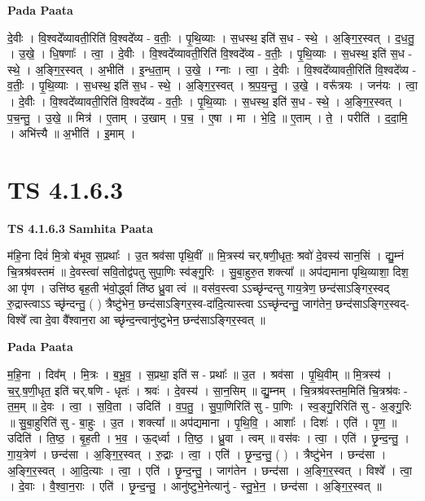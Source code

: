 \documentclass[17pt]{extarticle}
\begin{document}
\textbf{Pada Paata} \newline

दे॒वीः । वि॒श्वदे᳚व्यावती॒रिति॑ वि॒श्वदे᳚व्य - व॒तीः॒ । पृ॒थि॒व्याः । स॒धस्थ॒ इति॑ स॒ध - स्थे॒ । अ॒ङ्गि॒र॒स्वत् । द॒ध॒तु॒ । उ॒खे॒ । धि॒षणाः᳚ । त्वा॒ । दे॒वीः । वि॒श्वदे᳚व्यावती॒रिति॑ वि॒श्वदे᳚व्य - व॒तीः॒ । पृ॒थि॒व्याः । स॒धस्थ॒ इति॑ स॒ध - स्थे॒ । अ॒ङ्गि॒र॒स्वत् । अ॒भीति॑ । इ॒न्ध॒ता॒म् । उ॒खे॒ । ग्नाः । त्वा॒ । दे॒वीः । वि॒श्वदे᳚व्यावती॒रिति॑ वि॒श्वदे᳚व्य - व॒तीः॒ । पृ॒थि॒व्याः । स॒धस्थ॒ इति॑ स॒ध - स्थे॒ । अ॒ङ्गि॒र॒स्वत् । श्र॒प॒य॒न्तु॒ । उ॒खे॒ । वरू᳚त्रयः । जन॑यः । त्वा॒ । दे॒वीः । वि॒श्वदे᳚व्यावती॒रिति॑ वि॒श्वदे᳚व्य - व॒तीः॒ । पृ॒थि॒व्याः । स॒धस्थ॒ इति॑ स॒ध - स्थे॒ । अ॒ङ्गि॒र॒स्वत् । प॒च॒न्तु॒ । उ॒खे॒ ॥ मित्र॑ । ए॒ताम् । उ॒खाम् । प॒च॒ । ए॒षा । मा । भे॒दि॒ ॥ ए॒ताम् । ते॒ । परीति॑ । द॒दा॒मि॒ । अभि॑त्त्यै ॥ अ॒भीति॑ । इ॒माम् ।  \newline





\section{ TS 4.1.6.3 }

\textbf{TS 4.1.6.3 } \newline
\textbf{Samhita Paata} \newline

म॑हि॒ना दिवं॑ मि॒त्रो ब॑भूव स॒प्रथाः᳚ । उ॒त श्रव॑सा पृथि॒वीं ॥ मि॒त्रस्य॑ चर्.षणी॒धृतः॒ श्रवो॑ दे॒वस्य॑ सान॒सिं । द्यु॒म्नं चि॒त्रश्र॑वस्तमं ॥ दे॒वस्त्वा॑ सवि॒तोद्व॑पतु सुपा॒णिः स्व॑ङ्गु॒रिः । सु॒बा॒हुरु॒त शक्त्या᳚ ॥ अप॑द्यमाना पृथि॒व्याशा॒ दिश॒ आ पृ॑ण । उत्ति॑ष्ठ बृह॒ती भ॑वो॒र्द्ध्वा ति॑ष्ठ ध्रु॒वा त्वं ॥ वस॑व॒स्त्वा ऽऽच्छृ॑न्दन्तु गाय॒त्रेण॒ छन्द॑साऽङ्गिर॒स्वद् रु॒द्रास्त्वाऽऽ च्छृ॑न्दन्तु॒ ( ) त्रैष्टु॑भेन॒ छन्द॑साऽङ्गिर॒स्व-दा॑दि॒त्यास्त्वा ऽऽच्छृ॑न्दन्तु॒ जाग॑तेन॒ छन्द॑साऽङ्गिर॒स्वद्-विश्वे᳚ त्वा दे॒वा वै᳚श्वान॒रा आ च्छृ॑न्द॒न्त्वानु॑ष्टुभेन॒ छन्द॑साऽङ्गिर॒स्वत् ॥ \newline

\textbf{Pada Paata} \newline

म॒हि॒ना । दिव᳚म् । मि॒त्रः । ब॒भू॒व॒ । स॒प्रथा॒ इति॑ स - प्रथाः᳚ ॥ उ॒त । श्रव॑सा । पृ॒थि॒वीम् ॥ मि॒त्रस्य॑ । च॒र्॒.ष॒णी॒धृत॒ इति॑ चर्.षणि - धृतः॑ । श्रवः॑ । दे॒वस्य॑ । सा॒न॒सिम् ॥ द्यु॒म्नम् । चि॒त्रश्र॑वस्तम॒मिति॑ चि॒त्रश्र॑वः - त॒म॒म् ॥ दे॒वः । त्वा॒ । स॒वि॒ता । उदिति॑ । व॒प॒तु॒ । सु॒पा॒णिरिति॑ सु - पा॒णिः । स्व॒ङ्गु॒रिरिति॑ सु - अ॒ङ्गु॒रिः ॥ सु॒बा॒हुरिति॑ सु - बा॒हुः । उ॒त । शक्त्या᳚ ॥ अप॑द्यमाना । पृ॒थि॒वि॒ । आशाः᳚ । दिशः॑ । एति॑ । पृ॒ण॒ ॥ उदिति॑ । ति॒ष्ठ॒ । बृ॒ह॒ती । भ॒व॒ । ऊ॒द्‌र्ध्वा । ति॒ष्ठ॒ । ध्रु॒वा । त्वम् ॥ वस॑वः । त्वा॒ । एति॑ । छृ॒न्द॒न्तु॒ । गा॒य॒त्रेण॑ । छन्द॑सा । अ॒ङ्गि॒र॒स्वत् । रु॒द्राः । त्वा॒ । एति॑ । छृ॒न्द॒न्तु॒ ( ) । त्रैष्टु॑भेन । छन्द॑सा । अ॒ङ्गि॒र॒स्वत् । आ॒दि॒त्याः । त्वा॒ । एति॑ । छृ॒न्द॒न्तु॒ । जाग॑तेन । छन्द॑सा । अ॒ङ्गि॒र॒स्वत् । विश्वे᳚ । त्वा॒ । दे॒वाः । वै॒श्वा॒न॒राः । एति॑ । छृ॒न्द॒न्तु॒ । आनु॑ष्टुभे॒नेत्यानु॑ - स्तु॒भे॒न॒ । छन्द॑सा । अ॒ङ्गि॒र॒स्वत् ॥  \newline
\end{document}
